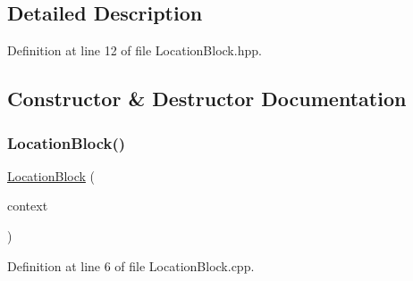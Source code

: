 \subsection{Detailed Description}


Definition at line 12 of file Location\+Block.\+hpp.



\subsection{Constructor \& Destructor Documentation}
\mbox{\label{classft_1_1_location_block_a28cbc9fd5dfde06685c8f7be5b6e0a4a}} 
\subsubsection{\texorpdfstring{Location\+Block()}{LocationBlock()}}
{\footnotesize\ttfamily \hyperlink{classft_1_1_location_block}{Location\+Block} (\begin{DoxyParamCaption}\item[{const \hyperlink{classft_1_1_base_directives}{Base\+Directives} \&}]{context }\end{DoxyParamCaption})}



Definition at line 6 of file Location\+Block.\+cpp.


